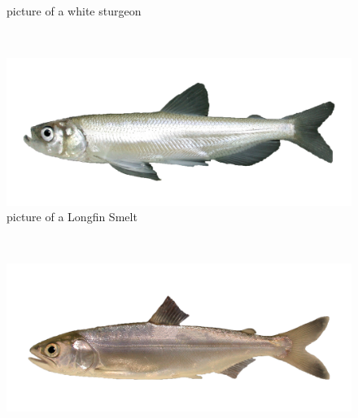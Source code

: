 \documentclass[
]{book}
\begin{document}
\begin{panel-grid}
\begin{columns-nocenter}
\begin{column800}
\begin{figure}
{}

\caption{picture of a white sturgeon}\label{fig:unnamed-chunk-170}
\end{figure}

\end{column800}

\begin{column40}

~

\end{column40}

\begin{column800}

\begin{figure}

{\centering \includegraphics[width=29.17in]{figures/longfin_smelt_adult} 

}

\caption{picture of a Longfin Smelt}\label{fig:unnamed-chunk-171}
\end{figure}

\end{column800}

\begin{column40}

~

\end{column40}

\begin{column800}

\begin{figure}

{\centering \includegraphics[width=29.17in]{figures/chinook_salmon_smolt} 

}
\end{figure}
\end{column800}
\end{columns-nocenter}
\end{panel-grid}
\end{document}
